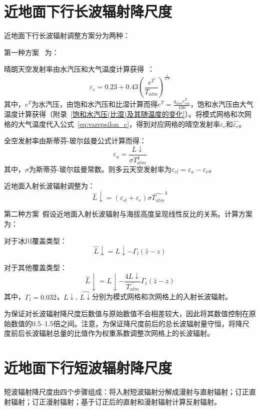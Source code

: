 \section{近地面下行长波辐射降尺度}
近地面下行长波辐射调整方案分为两种：

第一种方案~\citep{fiddes2014toposcale} 为：

晴朗天空发射率由水汽压和大气温度计算获得~\citep{konzelmann1994parameterization}：
\begin{equation}\label{eq:varepsilon_c}
\varepsilon_{c}=0.23+0.43 \left(\frac{e^{T}}{T_{atm}}\right)^\frac{1}{5.7}
\end{equation}
其中，$e^{T}$为水汽压，由饱和水汽压和比湿计算而得$e^{T}= \frac{q_{atm} e_{sat}^{T}}{100}$，饱和水汽压由大气温度计算获得（附录~\ref{饱和水汽压(比湿)及其随温度的变化}）。将模式网格和次网格的大气温度代入公式~\eqref{eq:varepsilon_c}，得到对应网格的晴空发射率$\varepsilon_c$和$\hat{\varepsilon_{c}}$。

全空发射率由斯蒂芬-玻尔兹曼公式计算而得： 
\begin{equation}
\varepsilon_{a}=\frac{L↓}{\sigma T_{atm}^4}
\end{equation}
其中，$\sigma$为斯蒂芬-玻尔兹曼常数。则多云天空发射率为$\varepsilon_{cl}=\varepsilon_{a}-\varepsilon_{c}$。

近地面入射长波辐射调整为：
\begin{equation}
\hat{L}↓=\left(\varepsilon_{cl}+\varepsilon_{c}\right) \sigma \hat{T_{atm}}^4
\end{equation}

第二种方案~\citep{Tricht2016}假设近地面入射长波辐射与海拔高度呈现线性反比的关系。计算方案为：

对于冰川覆盖类型：
\begin{equation}
\hat{L}↓=L↓-\Gamma_{l} \left(\hat{z}-z\right)       
\end{equation}

对于其他覆盖类型：
\begin{equation}
\hat{L}↓=L↓-\frac{4 L↓}{\bar{T_{atm}}} \Gamma_{t} \left(\hat{z}-z\right)      
\end{equation}
其中，$\Gamma_{l}=0.032$，$L↓$, $\hat{L↓}$分别为模式网格和次网格上的入射长波辐射。

为保证对长波辐射降尺度后数值与原始数值不会相差较大，因此将其数值控制在原始数值的0.5--1.5倍之间。注意，为保证降尺度前后的总长波辐射量守恒，将降尺度前后长波辐射总量的比值作为权重系数调整次网格上的长波辐射。

\section{近地面下行短波辐射降尺度}
短波辐射降尺度由四个步骤组成：将入射短波辐射分解成漫射与直射辐射；订正直射辐射；订正漫射辐射；基于订正后的直射和漫射辐射计算反射辐射。

